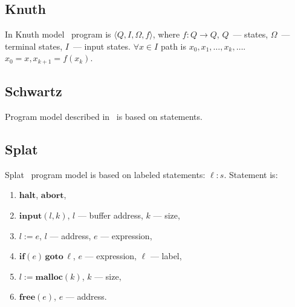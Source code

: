 \documentclass[fleqn,oneside,a4]{article}
\newcommand{\sublevel}{\subsection}
\newcommand{\ra}{\rightarrow}
\begin{document}
\sublevel{Knuth}

In Knuth model~\cite{knuth} program is $\langle Q, I, \Omega, f \rangle$,
where $f: Q \ra Q$, $Q$~--- states, $\Omega$~--- terminal states,
$I$~--- input states.
$\forall x \in I$ path is $x_0, x_1, \dots, x_k, \dots$.
$x_0 = x, x_{k + 1} = f(x_k)$.

\sublevel{Schwartz}

Program model described in~\cite{dta_fse} is based on statements.

\sublevel{Splat}

Splat~\cite{splat} program model is based on labeled statements: $\ell: s$.
Statement is:
\begin{enumerate}[itemsep=-0.5ex]
    \item $\textbf{halt}$, $\textbf{abort}$,
    \item $\textbf{input}(l, k)$, $l$ --- buffer address, $k$ --- size,
    \item $l := e$, $l$ --- address, $e$ --- expression,
    \item $\textbf{if}(e)\,\textbf{goto}\, \ell$, $e$ --- expression,
        $\ell$ --- label,
    \item $l := \textbf{malloc}(k)$, $k$ --- size,
    \item $\textbf{free}(e)$, $e$ --- address.
\end{enumerate}


{}

\end{document}
